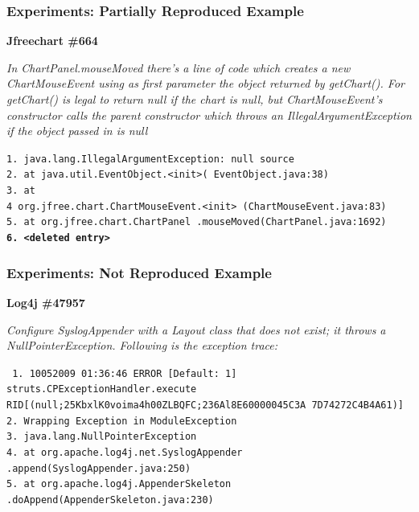 \documentclass{beamer}
\begin{document}
\begin{frame}
\frametitle{Experiments: Partially Reproduced Example}

\textbf{Jfreechart \#664}

\vspace{0.4cm} 

\textit{In ChartPanel.mouseMoved there's a line
of code which creates a new ChartMouseEvent using as first
parameter the object returned by getChart(). For getChart() is
legal to return null if the chart is null, but ChartMouseEvent's
constructor calls the parent constructor which throws an
IllegalArgumentException if the object passed in is null}

\vspace{0.4cm} 

\begin{small}
\texttt{1. java.lang.IllegalArgumentException: null source\\
2. at java.util.EventObject.<init>(
EventObject.java:38)\\
3. at\\
4 org.jfree.chart.ChartMouseEvent.<init>
(ChartMouseEvent.java:83)\\
5. at org.jfree.chart.ChartPanel
.mouseMoved(ChartPanel.java:1692)\\
\textbf{6. <deleted entry>}}
\end{small}

\end{frame}

\begin{frame}
\frametitle{Experiments: Not Reproduced Example}

\textbf{Log4j \#47957}

\vspace{0.4cm} 

\textit{Configure SyslogAppender with a Layout class that does not
exist; it throws a NullPointerException. Following is the
exception trace:}

\vspace{0.4cm} 

\begin{small}

\texttt{
1. 10052009 01:36:46 ERROR [Default: 1]
struts.CPExceptionHandler.execute
RID[(null;25KbxlK0voima4h00ZLBQFC;236Al8E60000045C3A
7D74272C4B4A61)]\\
2. Wrapping Exception in ModuleException\\
3. java.lang.NullPointerException\\
4. at org.apache.log4j.net.SyslogAppender
.append(SyslogAppender.java:250)\\
5. at org.apache.log4j.AppenderSkeleton
.doAppend(AppenderSkeleton.java:230)}

\end{small}

\end{frame}
\end{document}
